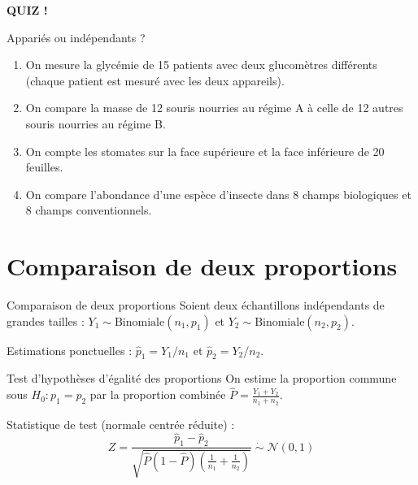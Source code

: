 \documentclass{BeamerTemplate}
\begin{document}
\begin{frame}[plain,t]
  \centerline{\LARGE\bfseries\alert{QUIZ !}}

  \medskip
  Appariés ou indépendants ?
  \small
  \begin{enumerate}\itemsep 2.5mm
    \item On mesure la glycémie de 15 patients avec deux glucomètres différents (chaque patient est mesuré avec les deux appareils). \\
    \item On compare la masse de 12 souris nourries au régime A à celle de 12 autres souris nourries au régime B. \\
    \item On compte les stomates sur la face supérieure et la face inférieure de 20 feuilles. \\
    \item On compare l'abondance d'une espèce d'insecte dans 8 champs biologiques et 8 champs conventionnels. \\
  \end{enumerate}
\end{frame}

\section{Comparaison de deux proportions}

\begin{frame}[t]{Comparaison de deux proportions}
  Soient deux échantillons indépendants de grandes tailles :
  $Y_1 \sim \text{Binomiale}(n_1, p_1)$ et $Y_2 \sim \text{Binomiale}(n_2, p_2)$.

  \smallskip
  Estimations ponctuelles : $\hat{p}_1 = Y_1/n_1$ et $\hat{p}_2 = Y_2/n_2$.

  \medskip
  \begin{Boite}{Test d'hypothèses d'égalité des proportions}
    On estime la proportion commune sous $H_0: p_1 = p_2$ par la \alert{proportion combinée}
    $\displaystyle \widehat{P} = \frac{Y_1 + Y_2}{n_1 + n_2}$.

    \smallskip
    Statistique de test (normale centrée réduite) :
    \[
      Z = \frac{\hat{p}_1 - \hat{p}_2}{\sqrt{\widehat{P}(1 - \widehat{P})\left(\frac{1}{n_1} + \frac{1}{n_2}\right)}} \;\dot{\sim}\; \mathcal{N}(0, 1)
    \]
  \end{Boite}
\end{frame}
\end{document}
